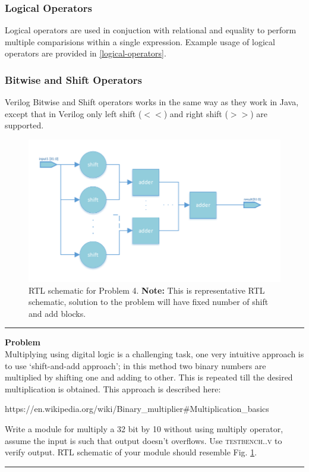 \documentclass[a4paper,10pt]{article}
\newcommand{\ano}{\text{1}}
\theoremstyle{mytheor}
\newcommand{
  \insertverilog}[3]{
  
}
\newcounter{problemNumber}
\newcommand {
  \insertProblem}[1]{
  \vspace{0.5cm}
  \hrule
  \vspace{0.3cm}

  {\color{greatblue}\textbf{\large{Problem \theproblemNumber}}}
  \vspace{2pt}\\#1

  \addtocounter{problemNumber}{1}
  \vspace{0.2cm}
  \hrule  
  \vspace{0.5cm}
}
\begin{document}
\subsubsection*{Logical Operators}
Logical operators are used in conjuction with relational and equality
to perform multiple comparisions within a single expression.
Example usage of logical operators are provided in \ref{logical-operators}.
\insertverilog{./verilog_files/logicalOperators.v}{logical-operators}{\text{Functioning of logical operator}}

\subsubsection*{Bitwise and Shift Operators}
Verilog Bitwise and Shift operators works in the same way as they work
in Java, except that in Verilog only left shift (\textbf{$<<$}) and right shift
(\textbf{$>>$}) are supported.

\begin{figure}[!h] \centering  
  \includegraphics[width=0.9\linewidth]{./resources/shift_and_add_representation.pdf}
  \caption{RTL schematic for Problem 4. \textbf{Note:} This is representative RTL schematic, solution to the problem will have fixed number of shift and add blocks.} 
  \label{Fig:problem-4-RTL} 
\end{figure}    

\insertProblem {
  Multiplying using digital logic is a challenging task, one very intuitive approach is to use `shift-and-add approach'; in this method two binary numbers are multiplied by shifting one and adding to other. This is repeated till the desired multiplication is obtained. This approach is described here: \begin{center}https://en.wikipedia.org/wiki/Binary\_multiplier\#Multiplication\_basics\end{center} 
  
    Write a module for multiply a 32 bit by 10 without using multiply operator, assume the input is such that output doesn't overflows. Use \textsc{testbench{\ano}.{\theproblemNumber}.v} to verify output. RTL schematic of your module should resemble Fig. \ref{Fig:problem-4-RTL}.
}
\end{document}
